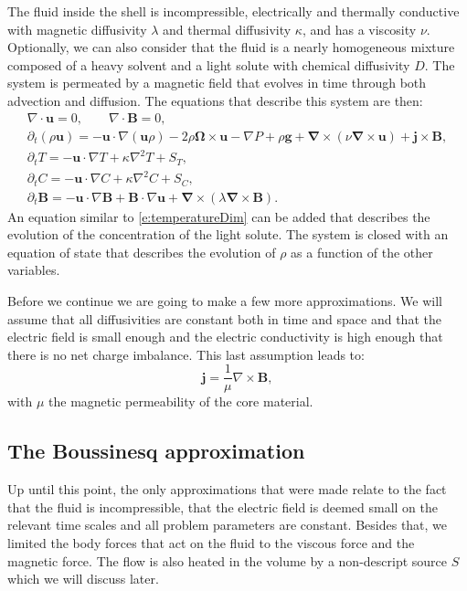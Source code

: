 \documentclass[a4paper,10pt]{book}
\renewcommand{\vec}[1]{\mathbf{#1}}
\begin{document}
The fluid inside the shell is incompressible, electrically and thermally
conductive with magnetic diffusivity $\lambda$ and thermal diffusivity $\kappa$,
and has a viscosity $\nu$. Optionally, we can also consider that the fluid is a
nearly homogeneous mixture composed of a heavy solvent and a light solute with
chemical diffusivity $D$. The system is permeated by a magnetic field that
evolves in time through both advection and diffusion. The equations that
describe this system are then:
\begin{subequations}
\begin{gather}
\label{e:nonDivergenceDim}
\nabla \cdot \vec u = 0, \qquad \nabla \cdot \vec B = 0, \\
\label{e:NavierStokesDim}
\partial_t(\rho \vec u) = - \vec u \cdot \nabla (\vec u\rho) -
 2\rho\vec\Omega \times \vec u
 -\nabla P + \rho \vec{g} +
\vec\nabla\times(\nu\vec\nabla\times\vec{u})+ \vec{j}\times\vec B, \\
\label{e:temperatureDim}
\partial_t T = - \vec u \cdot \nabla T + \kappa \nabla^2 T + S_T, \\
\label{e:compositionDim}
\partial_t C = - \vec u \cdot \nabla C + \kappa \nabla^2 C + S_C, \\
\label{e:inductionDim}
\partial_t \vec B  =  - \vec u \cdot \nabla \vec B +  \vec B \cdot \nabla\vec u
+ \vec\nabla\times(\lambda\vec\nabla\times\vec{B}).
\end{gather}
\end{subequations}
An equation similar to \ref{e:temperatureDim} can be added that describes the
evolution of the concentration of the light solute. The system is closed with an
equation of state that describes the evolution of $\rho$ as a function of the
other variables.

Before we continue we are going to make a few more approximations. We will
assume that all diffusivities are constant both in time and space and that the
electric field is small enough and the electric conductivity is high enough that
there is no net charge imbalance. This last assumption leads to:
\begin{equation}
 \vec{j} = \frac{1}{\mu}\nabla\times\vec{B},
\end{equation}
with $\mu$ the magnetic permeability of the core material.

\subsection{The Boussinesq approximation}
Up until this point, the only approximations that were made relate to the fact
that the fluid is incompressible, that the electric field is deemed small on the
relevant time scales and all problem parameters are constant. Besides that, we
limited the body forces that act on the fluid to the viscous force and the
magnetic force. The flow is also heated in the volume by a non-descript source
$S$ which we will discuss later.
\end{document}
